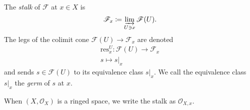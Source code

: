 \documentclass[12pt]{article}
\begin{document}
\begin{definition}
	The \emph{stalk} of $\mathscr{F}$ at $x\in X$ is 
	\begin{equation*}
		\mathscr{F}_x\coloneqq \varinjlim_{U\ni x}\mathscr{F}(U).
	\end{equation*}
	The legs of the colimit cone $\mathscr{F}(U)\to \mathscr{F}_x$ are denoted 
	\begin{gather*}
		\text{res}^U_x: \mathscr{F}(U) \to \mathscr{F}_x \\
		s \mapsto s|_x
	\end{gather*}
	and sends $s\in\mathscr{F}(U)$ to its equivalence class $s|_x$. We call the equivalence class $s|_x$ the \emph{germ} of $s$ at $x$.
\end{definition}

\begin{remark}
	When $(X,\mathcal{O}_X)$ is a ringed space, we write the stalk as $\mathcal{O}_{X,x}$.
\end{remark}
\end{document}
